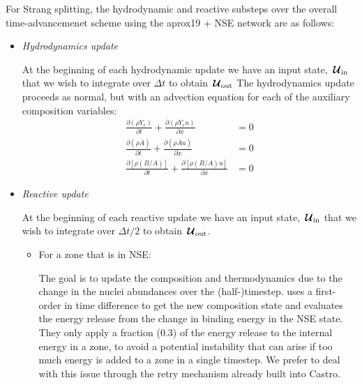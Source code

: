 \documentclass[times,modern]{aastex63}
\newcommand{\castro}{{\sf Castro}}
\newcommand{\ddx}[1]{{\frac{{\partial#1}}{\partial x}}}
\newcommand{\ddt}[1]{{\frac{{\partial#1}}{\partial t}}}
\newcommand{\Uc}{{\,\bm{\mathcal{U}}}}
\begin{document}
For Strang splitting, the hydrodynamic and reactive substeps over
the overall time-advancemenet scheme using the aprox19 + NSE network
are as follows:
\begin{itemize}

\item {\em Hydrodynamics update}
  
  At the beginning of each hydrodynamic update we have an input state,
  $\Uc_{\rm in}$ that we wish to integrate over $\Delta t$ to obtain $\Uc_{\rm out}$
  The hydrodynamics update proceeds as normal, but with an advection
  equation for each of the auxiliary composition variables:
  \begin{align}
    \ddt{(\rho Y_e)} + \ddx{(\rho Y_e u)} &= 0 \\
    \ddt{(\rho \bar{A})} + \ddx{(\rho \bar{A} u)} &= 0 \\
    \ddt{[\rho (B/A)]} + \ddx{[\rho (B/A) u]} &= 0 
  \end{align}


\item {\em Reactive update}

  At the beginning of each reactive update we have an input state,
  $\Uc_{\rm in}$ that we wish to integrate over $\Delta t/2$ to obtain $\Uc_{\rm out}$.
  
  \begin{itemize}

    \item For a zone that is in NSE:

      The goal is to update the composition and thermodynamics due to the 
      change in the nuclei abundances over the (half-)timestep.  \citet{ma:2013}
      uses a first-order in time difference to get the new composition state
      and evaluates the energy release from the change in binding energy in the NSE
      state.  They only apply a fraction (0.3) of the energy release to the internal
      energy in a zone, to avoid a potential instability that can arise if too much
      energy is added to a zone in a single timestep.  We prefer to deal with this
      issue through the retry mechanism already built into \castro.


\end{itemize}
\end{itemize}
\end{document}
